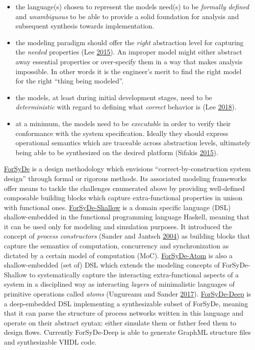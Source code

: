 \documentclass[
  a4paper,
]{article}
\providecommand{\tightlist}{%
  \setlength{\itemsep}{0pt}\setlength{\parskip}{0pt}}
\begin{document}
\begin{itemize}
\tightlist
\item
  the language(s) chosen to represent the models need(s) to be
  \emph{formally defined} and \emph{unambiguous} to be able to provide a
  solid foundation for analysis and subsequent synthesis towards
  implementation.
\item
  the modeling paradigm should offer the \emph{right} abstraction level
  for capturing the \emph{needed} properties (Lee
  \protect\hyperlink{ref-lee-2015}{2015}). An improper model might
  either abstract away essential properties or over-specify them in a
  way that makes analysis impossible. In other words it is the
  engineer's merit to find the right model for the right ``thing being
  modeled''.
\item
  the models, at least during initial development stages, need to be
  \emph{deterministic} with regard to defining what \emph{correct}
  behavior is (Lee \protect\hyperlink{ref-Lee18}{2018}).
\item
  at a minimum, the models need to be \emph{executable} in order to
  verify their conformance with the system specification. Ideally they
  should express operational semantics which are traceable across
  abstraction levels, ultimately being able to be synthesized on the
  desired platform (Sifakis \protect\hyperlink{ref-Sifakis15}{2015}).
\end{itemize}

\href{https://forsyde.github.io/}{ForSyDe} is a design methodology which
envisions ``correct-by-construction system design'' through formal or
rigorous methods. Its associated modeling frameworks offer means to
tackle the challenges enumerated above by providing well-defined
composable building blocks which capture extra-functional properties in
unison with functional ones.
\href{https://forsyde.github.io/forsyde-shallow}{ForSyDe-Shallow} is a
domain specific language (DSL) shallow-embedded in the functional
programming language Haskell, meaning that it can be used only for
modeling and simulation purposes. It introduced the concept of
\emph{process constructors} (Sander and Jantsch
\protect\hyperlink{ref-sander-2004}{2004}) as building blocks that
capture the semantics of computation, concurrency and synchronization as
dictated by a certain model of computation (MoC).
\href{https://forsyde.github.io/forsyde-atom}{ForSyDe-Atom} is also a
shallow-embedded (set of) DSL which extends the modeling concepts of
ForSyDe-Shallow to systematically capture the interacting
extra-functional aspects of a system in a disciplined way as interacting
\emph{layers} of minimalistic languages of primitive operations called
\emph{atoms} (Ungureanu and Sander
\protect\hyperlink{ref-ungureanu17}{2017}).
\href{https://forsyde.github.io/forsyde-deep}{ForSyDe-Deep} is a
deep-embedded DSL implementing a synthesizable subset of ForSyDe,
meaning that it can parse the structure of process networks written in
this language and operate on their abstract syntax: either simulate them
or futher feed them to design flows. Currently ForSyDe-Deep is able to
generate GraphML structure files and synthesizable VHDL code.
\end{document}
